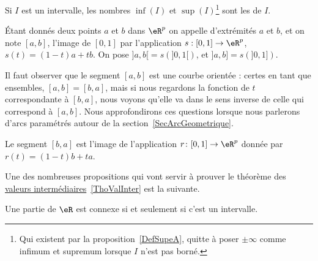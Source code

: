 Si \( I\) est un intervalle, les nombres \( \inf(I)\) et \( \sup(I)\)\footnote{Qui existent par la proposition~\ref{DefSupeA}, quitte à poser \( \pm\infty\) comme infimum et supremum lorsque \( I\) n'est pas borné.} sont les  de \( I\).

\begin{definition}      \label{DefLISOooDHLQrl}
	Étant donnés deux points $a$ et $b$ dans $\eR^p$ on appelle  d'extrémités $a$ et $b$, et on note $[a,b]$, l'image de $[0,1]$ par l'application $s: [0,1]\to \eR^p$, $s(t)= (1-t)a+tb$.  On pose $]a,b[=s\left(]0,1[\right)$, et  $]a,b]=s\left(]0,1]\right)$.
\end{definition}
Il faut observer que le segment $[a,b]$ est une courbe orientée : certes en tant que ensembles, $[a,b]=[b,a]$, mais si nous regardons la fonction de $t$ correspondante à $[b,a]$, nous voyons qu'elle va dans le sens inverse de celle qui correspond à $[a,b]$. Nous approfondirons ces questions lorsque nous parlerons d'arcs paramétrés autour de la section~\ref{SecArcGeometrique}.

Le segment $[b,a]$ est l'image de l'application $r\colon [0,1]\to \eR^p$ donnée par $r(t)=(1-t)b+ta$.

Une des nombreuses propositions qui vont servir à prouver le théorème des \href{http://fr.wikipedia.org/wiki/Théorème_des_valeurs_intermédiaires}{valeurs intermédiaires}~\ref{ThoValInter} est la suivante.
\begin{proposition} \label{PropInterssiConn}
    Une partie de $\eR$ est connexe si et seulement si c'est un intervalle.
\end{proposition}

